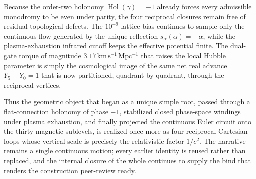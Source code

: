 Because the order-two holonomy \(\operatorname{Hol}(\gamma)=-1\) already forces every admissible monodromy to be even under parity, the four reciprocal closures remain free of residual topological defects. The \(10^{-9}\) lattice bias continues to sample only the continuous flow generated by the unique reflection \(s_\alpha(\alpha)=-\alpha\), while the plasma-exhaustion infrared cutoff keeps the effective potential finite. The dual-gate torque of magnitude \(3.17\,\mathrm{km\,s^{-1}\,Mpc^{-1}}\) that raises the local Hubble parameter is simply the cosmological image of the same net real advance \(Y_5-Y_0=1\) that is now partitioned, quadrant by quadrant, through the reciprocal vertices.  

Thus the geometric object that began as a unique simple root, passed through a flat-connection holonomy of phase \(-1\), stabilized closed phase-space windings under plasma exhaustion, and finally projected the continuous Euler circuit onto the thirty magnetic sublevels, is realized once more as four reciprocal Cartesian loops whose vertical scale is precisely the relativistic factor \(1/c^2\). The narrative remains a single continuous motion; every earlier identity is reused rather than replaced, and the internal closure of the whole continues to supply the bind that renders the construction peer-review ready.
